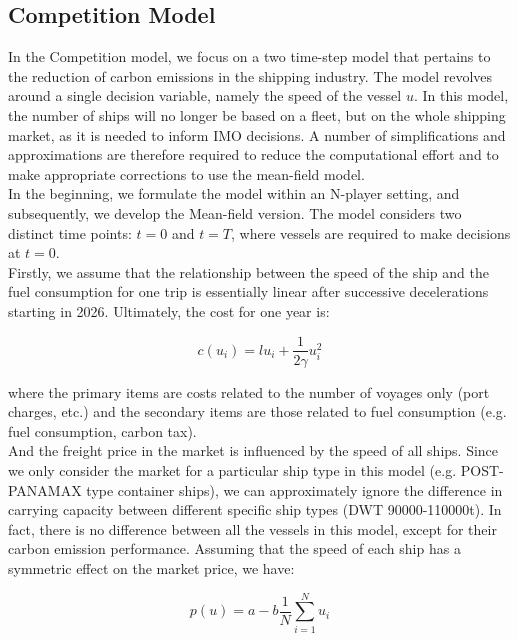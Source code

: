 \documentclass[a4paper,12pt]{article}
\begin{document}
\subsection{Competition Model}
In the Competition model, we focus on a two time-step model that pertains to the reduction of carbon emissions in the shipping industry.
The model revolves around a single decision variable, namely the speed of the vessel $u$.
In this model, the number of ships will no longer be based on a fleet, but on the whole shipping market, as it is needed to inform IMO decisions.
A number of simplifications and approximations are therefore required to reduce the computational effort and to make appropriate corrections to use the mean-field model.\\

In the beginning, we formulate the model within an N-player setting, and subsequently, we develop the Mean-field version. The model considers two distinct time points: $t = 0$ and $t = T$, where vessels are required to make decisions at $t = 0$.\\

Firstly, we assume that the relationship between the speed of the ship and the fuel consumption for one trip is essentially linear after successive decelerations starting in 2026. Ultimately, the cost for one year is:

\begin{equation}
	\label{eq:cost}
	c(u_i) = l u_i + \frac{1}{2 \gamma} u_i^2
\end{equation}

where the primary items are costs related to the number of voyages only (port charges, etc.) and the secondary items are those related to fuel consumption (e.g. fuel consumption, carbon tax).\\

And the freight price in the market is influenced by the speed of all ships.
Since we only consider the market for a particular ship type in this model (e.g. POST-PANAMAX type container ships), we can approximately ignore the difference in carrying capacity between different specific ship types (DWT 90000-110000t). In fact, there is no difference between all the vessels in this model, except for their carbon emission performance. Assuming that the speed of each ship has a symmetric effect on the market price, we have:

\begin{equation}
	\label{eq:price}
	p(u) = a - b \frac{1}{N}\sum_{i=1}^N u_i
\end{equation}
\end{document}
